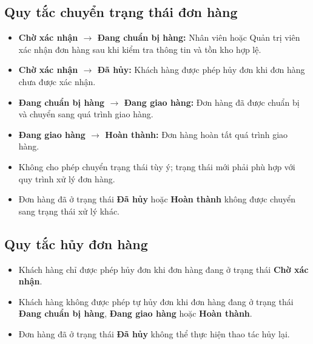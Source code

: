 \documentclass[12pt,a4paper]{article}
\begin{document}
\subsection*{Quy tắc chuyển trạng thái đơn hàng}
\begin{itemize}
    \item \textbf{Chờ xác nhận $\rightarrow$ Đang chuẩn bị hàng:} Nhân viên hoặc Quản trị viên xác nhận đơn hàng sau khi kiểm tra thông tin và tồn kho hợp lệ.
    \item \textbf{Chờ xác nhận $\rightarrow$ Đã hủy:} Khách hàng được phép hủy đơn khi đơn hàng chưa được xác nhận.
    \item \textbf{Đang chuẩn bị hàng $\rightarrow$ Đang giao hàng:} Đơn hàng đã được chuẩn bị và chuyển sang quá trình giao hàng.
    \item \textbf{Đang giao hàng $\rightarrow$ Hoàn thành:} Đơn hàng hoàn tất quá trình giao hàng.
    \item Không cho phép chuyển trạng thái tùy ý; trạng thái mới phải phù hợp với quy trình xử lý đơn hàng.
    \item Đơn hàng đã ở trạng thái \textbf{Đã hủy} hoặc \textbf{Hoàn thành} không được chuyển sang trạng thái xử lý khác.
\end{itemize}

\subsection*{Quy tắc hủy đơn hàng}
\begin{itemize}
    \item Khách hàng chỉ được phép hủy đơn khi đơn hàng đang ở trạng thái \textbf{Chờ xác nhận}.
    \item Khách hàng không được phép tự hủy đơn khi đơn hàng đang ở trạng thái \textbf{Đang chuẩn bị hàng}, \textbf{Đang giao hàng} hoặc \textbf{Hoàn thành}.
    \item Đơn hàng đã ở trạng thái \textbf{Đã hủy} không thể thực hiện thao tác hủy lại.
\end{itemize}
\end{document}
